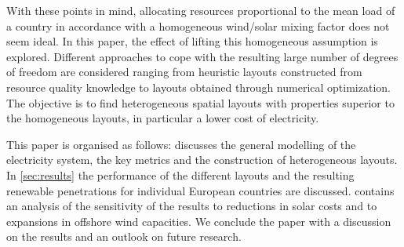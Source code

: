\documentclass[a4paper, 5p, sort&compress]{elsarticle}%
\begin{document}
With these points in mind, allocating resources proportional to the
mean load of a country in accordance with a homogeneous wind/solar
mixing factor does not seem ideal. In this paper, the effect of
lifting this homogeneous assumption is explored. Different approaches
to cope with the resulting large number of degrees of freedom are
considered ranging from heuristic layouts constructed from resource
quality knowledge to layouts obtained through numerical
optimization. The objective is to find heterogeneous spatial layouts
with properties superior to the homogeneous layouts, in particular a
lower cost of electricity.




This paper is organised as follows:  discusses the
general modelling of the electricity system, the key metrics and the
construction of heterogeneous layouts. In \cref{sec:results} the
performance of the different layouts and the resulting renewable
penetrations for individual European countries are
discussed.  contains an analysis of the
sensitivity of the results to reductions in solar costs and to
expansions in offshore wind capacities. We conclude the paper with a
discussion on the results and an outlook on future research.
\end{document}
